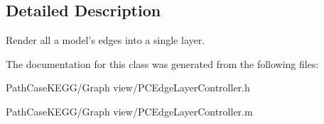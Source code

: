 \subsection{Detailed Description}
Render all a model's edges into a single layer. 

The documentation for this class was generated from the following files:\begin{DoxyCompactItemize}
\item 
PathCaseKEGG/Graph view/PCEdgeLayerController.h\item 
PathCaseKEGG/Graph view/PCEdgeLayerController.m\end{DoxyCompactItemize}
